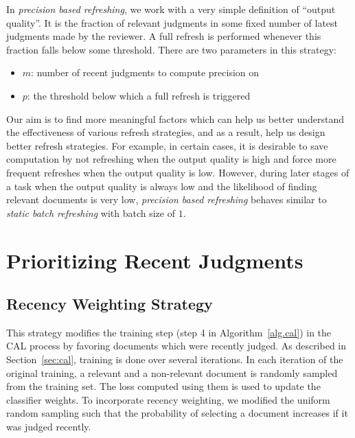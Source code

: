 In \textit{precision based refreshing}, we work with a very simple definition of
``output quality''. It is the fraction of relevant judgments in some fixed
number of latest judgments made by the reviewer. A full refresh is performed
whenever this fraction falls below some threshold. There are two parameters in
this strategy:
\begin{itemize}
    \item $m$: number of recent judgments to compute precision on
    \item $p$: the threshold below which a full refresh is triggered
\end{itemize}

Our aim is to find more meaningful factors which can help us better understand
the effectiveness of various refresh strategies, and as a result, help us design
better refresh strategies. For example, in certain cases, it is desirable to
save computation by not refreshing when the output quality is high and force
more frequent refreshes when the output quality is low. However, during later
stages of a task when the output quality is always low and the likelihood of
finding relevant documents is very low, \textit{precision based refreshing}
behaves similar to \textit{static batch refreshing} with batch size of $1$.


\section{Prioritizing Recent Judgments}

\subsection{Recency Weighting Strategy}
\label{sec:recency}
This strategy modifies the training step (step 4 in Algorithm~\ref{alg.cal}) in
the CAL process by favoring documents which were recently judged. As described
in Section~\ref{sec:cal}, training is done over several iterations. In each
iteration of the original training, a relevant and a non-relevant document is
randomly sampled from the training set. The loss computed using them is used to
update the classifier weights. To incorporate recency weighting, we modified the
uniform random sampling such that the probability of selecting a document
increases if it was judged recently.

